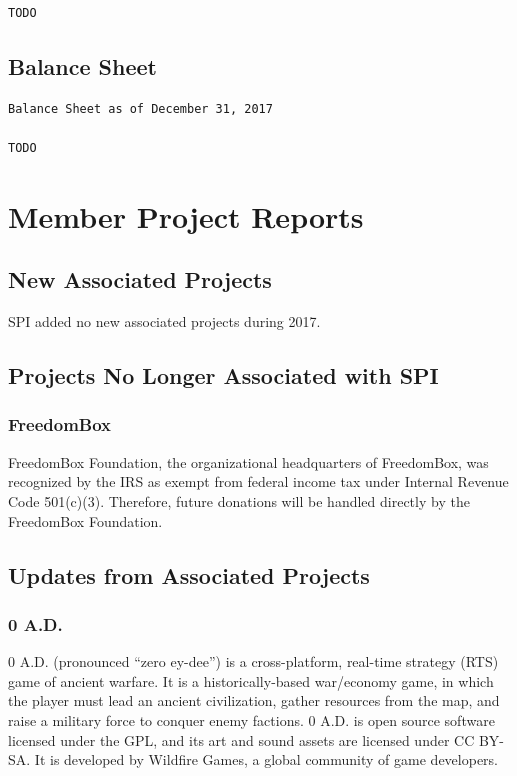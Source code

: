 \documentclass[a4paper]{report}
\begin{document}
\begin{verbatim}
TODO
\end{verbatim}

\section{Balance Sheet}

\begin{verbatim}
Balance Sheet as of December 31, 2017

TODO
\end{verbatim}

\chapter{Member Project Reports}

\section{New Associated Projects}

SPI added no new associated projects during 2017.

\section{Projects No Longer Associated with SPI}

\subsection{FreedomBox}

FreedomBox Foundation, the organizational headquarters of FreedomBox,
was recognized by the IRS as exempt from federal income tax under
Internal Revenue Code 501(c)(3).  Therefore, future donations will
be handled directly by the FreedomBox Foundation.

\section{Updates from Associated Projects}

\subsection{0 A.D.}

0 A.D. (pronounced ``zero ey-dee'') is a cross-platform, real-time
strategy (RTS) game of ancient warfare. It is a historically-based
war/economy game, in which the player must lead an ancient civilization,
gather resources from the map, and raise a military force to conquer
enemy factions. 0 A.D. is open source software licensed under the GPL,
and its art and sound assets are licensed under CC BY-SA. It is
developed by Wildfire Games, a global community of game developers.
\end{document}
